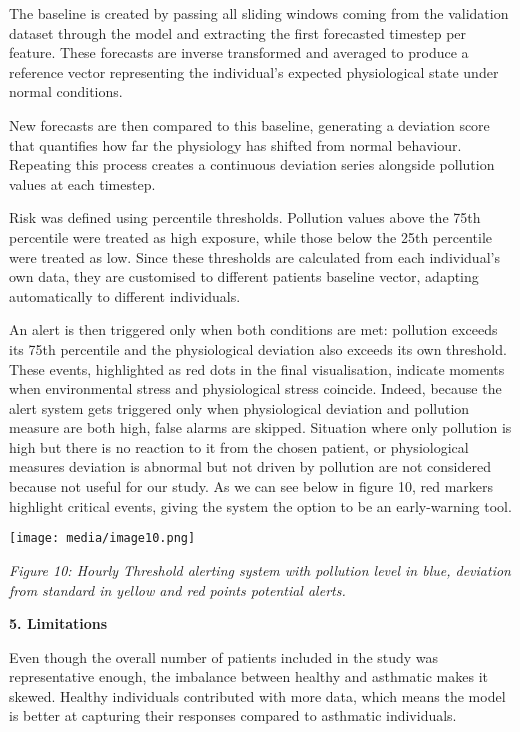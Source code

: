 \documentclass[
]{article}
\begin{document}
The baseline is created by passing all sliding windows coming from the
validation dataset through the model and extracting the first forecasted
timestep per feature. These forecasts are inverse transformed and
averaged to produce a reference vector representing the individual's
expected physiological state under normal conditions.

New forecasts are then compared to this baseline, generating a deviation
score that quantifies how far the physiology has shifted from normal
behaviour. Repeating this process creates a continuous deviation series
alongside pollution values at each timestep.

Risk was defined using percentile thresholds. Pollution values above the
75th percentile were treated as high exposure, while those below the
25th percentile were treated as low. Since these thresholds are
calculated from each individual's own data, they are customised to
different patients baseline vector, adapting automatically to different
individuals.

An alert is then triggered only when both conditions are met: pollution
exceeds its 75th percentile and the physiological deviation also exceeds
its own threshold. These events, highlighted as red dots in the final
visualisation, indicate moments when environmental stress and
physiological stress coincide. Indeed, because the alert system gets
triggered only when physiological deviation and pollution measure are
both high, false alarms are skipped. Situation where only pollution is
high but there is no reaction to it from the chosen patient, or
physiological measures deviation is abnormal but not driven by pollution
are not considered because not useful for our study. As we can see below
in figure 10, red markers highlight critical events, giving the system
the option to be an early-warning tool.

\texttt{[image: media/image10.png]}

\emph{Figure 10: Hourly Threshold alerting system with pollution level
in blue, deviation from standard in yellow and red points potential
alerts.}

\textbf{5. Limitations}

Even though the overall number of patients included in the study was
representative enough, the imbalance between healthy and asthmatic makes
it skewed. Healthy individuals contributed with more data, which means
the model is better at capturing their responses compared to asthmatic
individuals.
\end{document}
